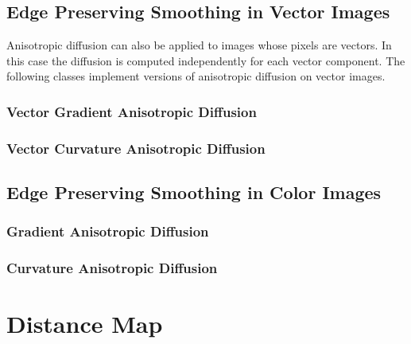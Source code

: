\subsection{Edge Preserving Smoothing in Vector Images}
\label{sec:VectorAnisotropicDiffusion}

Anisotropic diffusion can also be applied to images whose pixels are vectors.
In this case the diffusion is computed independently for each vector component.
The following classes implement versions of anisotropic diffusion on vector images.


\subsubsection{Vector Gradient Anisotropic Diffusion}
\label{sec:VectorGradientAnisotropicDiffusionImageFilter}

%

\subsubsection{Vector Curvature Anisotropic Diffusion}
\label{sec:VectorCurvatureAnisotropicDiffusionImageFilter}

%



\subsection{Edge Preserving Smoothing in Color Images}
\label{sec:ColorAnisotropicDiffusion}

\subsubsection{Gradient Anisotropic Diffusion}
\label{sec:ColorGradientAnisotropicDiffusion}

%

\subsubsection{Curvature Anisotropic Diffusion}
\label{sec:ColorCurvatureAnisotropicDiffusion}

%



\section{Distance Map}
\label{sec:DistanceMap}





